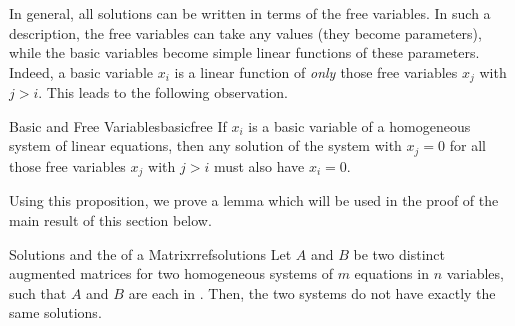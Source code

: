 In general, all solutions can be written in terms of the free variables. In such a description, the free variables can take any values (they become parameters), while the basic variables become simple linear functions of these parameters. Indeed, a basic variable $x_i$ is a linear function of {\em only \em}those free variables $x_j$ with $j>i$. This leads to the following observation.

\begin{proposition}{Basic and Free Variables}{basicfree}
If $x_i$ is a basic variable of a homogeneous system of linear equations, then any solution of the system with $x_j=0$ for all those free variables $x_j$ with $j>i$ must also have $x_i=0$.
\end{proposition}

Using this proposition, we prove a lemma which will be used in the proof of the main result of this section below.

\begin{lemma}{Solutions and the \RREF \;of a Matrix}{rrefsolutions}
Let $A$ and $B$ be two distinct augmented matrices for two homogeneous systems of $m$ equations in $n$ variables, such that $A$ and $B$ are each in \rref. Then, the two systems do not have exactly the same solutions.
\end{lemma}

